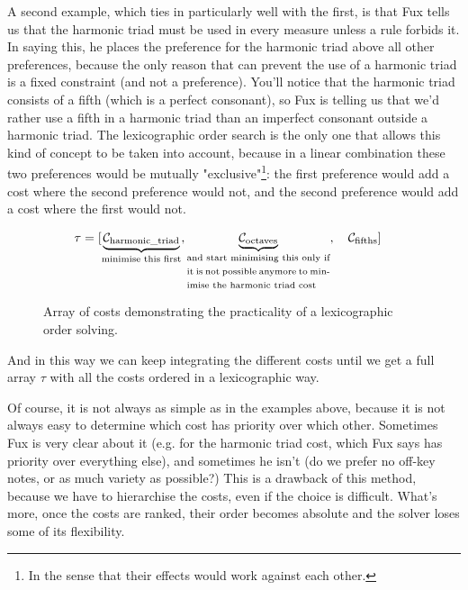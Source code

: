 A second example, which ties in particularly well with the first, is that Fux tells us that the harmonic triad must be used in every measure unless a rule forbids it. In saying this, he places the preference for the harmonic triad above all other preferences, because the only reason that can prevent the use of a harmonic triad is a fixed constraint (and not a preference). You'll notice that the harmonic triad consists of a fifth (which is a perfect consonant), so Fux is telling us that we'd rather use a fifth in a harmonic triad than an imperfect consonant outside a harmonic triad. The lexicographic order search is the only one that allows this kind of concept to be taken into account, because in a linear combination these two preferences would be mutually "exclusive"\footnote{In the sense that their effects would work against each other.}: the first preference would add a cost where the second preference would not, and the second preference would add a cost where the first would not.

\begin{figure}[h]
    \begin{equation}
        \begin{aligned}
            \tau = [& \underset{\text{\fontsize{7}{11}\selectfont{minimise this first}}}{\underbrace{\mathcal{C}_\text{harmonic\_triad}}}, \underset{\text{\fontsize{7}{11}\selectfont\parbox{4cm}{and start minimising this only if it is not possible anymore to minimise the harmonic triad cost}}}{\underbrace{\mathcal{C}_\text{octaves}}},\quad  \mathcal{C}_\text{fifths}]
        \end{aligned}
    \end{equation}
    \caption{Array of costs demonstrating the practicality of a lexicographic order solving.}
\end{figure}

And in this way we can keep integrating the different costs until we get a full array $\tau$ with all the costs ordered in a lexicographic way.


Of course, it is not always as simple as in the examples above, because it is not always easy to determine which cost has priority over which other. Sometimes Fux is very clear about it (e.g. for the harmonic triad cost, which Fux says has priority over everything else), and sometimes he isn't (do we prefer no off-key notes, or as much variety as possible?) This is a drawback of this method, because we have to hierarchise the costs, even if the choice is difficult. What's more, once the costs are ranked, their order becomes absolute and the solver loses some of its flexibility.


